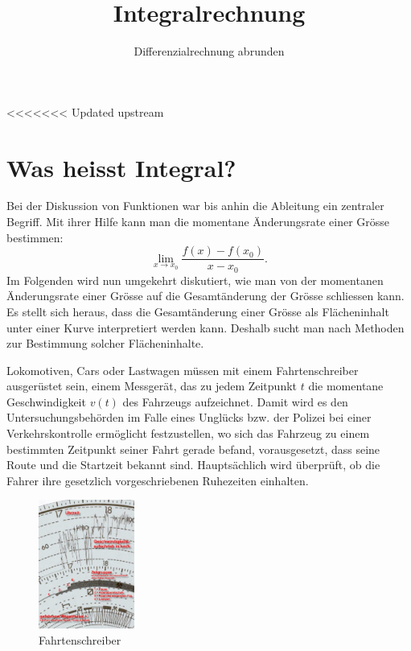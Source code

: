 \documentclass[%
<<<<<<< Updated upstream
11pt,%
twoside,%
titlepage,%
german,%
headsepline%
]{scrartcl}
\title{Integralrechnung}
\subtitle{Differenzialrechnung abrunden}
\author{}
\date{}
\begin{document}
\maketitle
\tableofcontents
\cleardoublepage

<<<<<<< Updated upstream
\section{Was heisst Integral?}

Bei der Diskussion von Funktionen war bis anhin die Ableitung ein zentraler Begriff. Mit ihrer Hilfe kann man die momentane Änderungsrate einer Grösse bestimmen:
$$\lim_{x\rightarrow x_0}\frac{f(x)-f(x_0)}{x-x_0}.$$
Im Folgenden wird nun umgekehrt diskutiert, wie man von der momentanen Änderungsrate einer Grösse auf die Gesamtänderung der Grösse schliessen kann. Es stellt sich heraus, dass die Gesamtänderung einer Grösse als Flächeninhalt unter einer Kurve interpretiert werden kann. Deshalb sucht man nach Methoden zur Bestimmung solcher Flächeninhalte.

Lokomotiven, Cars oder Lastwagen müssen mit einem Fahrtenschreiber ausgerüstet sein, einem Messgerät, das zu jedem Zeitpunkt $t$ die momentane Geschwindigkeit $v(t)$ des Fahrzeugs aufzeichnet. Damit wird es den Untersuchungsbehörden im Falle eines Unglücks bzw. der Polizei bei einer Verkehrskontrolle ermöglicht festzustellen, wo sich das Fahrzeug zu einem bestimmten Zeitpunkt seiner Fahrt gerade befand, vorausgesetzt, dass seine Route und die Startzeit bekannt sind. Hauptsächlich wird überprüft, ob die Fahrer ihre gesetzlich vorgeschriebenen Ruhezeiten einhalten.

\begin{figure}[h!t]
\begin{center}
\includegraphics[width=0.28\textwidth]{pictures/tachozoom}
\end{center}
\caption{Fahrtenschreiber}\label{abb:schreiber}
\end{figure}
\end{document}
